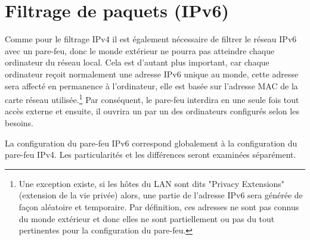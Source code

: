 
\section{Filtrage de paquets (IPv6)}

Comme pour le filtrage IPv4 il est également nécessaire de filtrer le réseau
IPv6 avec un pare-feu, donc le monde extérieur ne pourra pas atteindre chaque
ordinateur du réseau local. Cela est d'autant plus important, car chaque ordinateur
reçoit normalement une adresse IPv6 unique au monde, cette adresse sera affecté
en permanence à l'ordinateur, elle est basée sur l'adresse MAC de la carte réseau
utilisée.\footnote{Une exception existe, si les hôtes du LAN sont dits "Privacy
Extensions" (extension de la vie privée) alors, une partie de l'adresse IPv6
sera générée de façon aléatoire et temporaire. Par définition, ces adresses ne sont
pas connus du monde extérieur et donc elles ne sont partiellement ou pas du tout
pertinentes pour la configuration du pare-feu.} Par conséquent, le pare-feu interdira
en une seule fois tout accès externe et ensuite, il ouvrira un par un des ordinateurs
configurés selon les besoins.

La configuration du pare-feu IPv6 correspond globalement à la configuration du
pare-feu IPv4. Les particularités et les différences seront examinées séparément.

